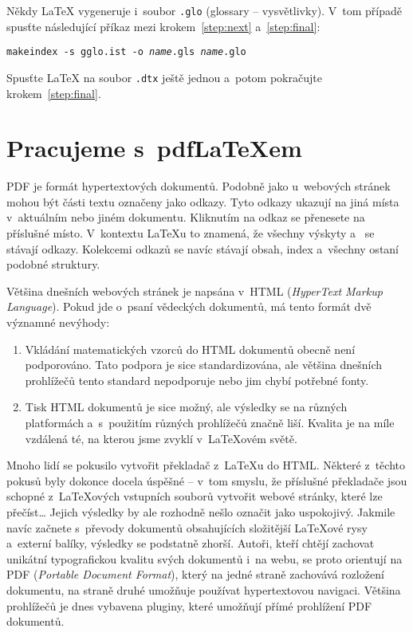 Někdy \LaTeX{} vygeneruje i~soubor \texttt{.glo} (glossary -- vysvětlivky).
V~tom případě spusťte následující příkaz mezi
krokem~\ref{step:next} a~\ref{step:final}:

\noindent\texttt{makeindex -s gglo.ist -o \textit{name}.gls \textit{name}.glo}

\noindent Spusťte \LaTeX{} na soubor \texttt{.dtx} ještě jednou
a~potom pokračujte krokem~\ref{step:final}.



\section{Pracujeme s~pdf\LaTeX em} \label{sec:pdftex}
%
PDF je formát hypertextových dokumentů. Podobně jako u~webových
stránek mohou být části textu označeny jako odkazy. Tyto
odkazy ukazují na jiná místa v~aktuálním nebo jiném dokumentu.
Kliknutím na odkaz se přenesete na příslušné místo.
V~kontextu \LaTeX u to znamená, že všechny výskyty 
a~ se stávají odkazy. Kolekcemi odkazů se navíc
stávají obsah, index a~všechny ostaní podobné struktury.

Většina dnešních webových stránek je napsána v~HTML
(\emph{HyperText Markup Language}). Pokud jde o~psaní vědeckých
dokumentů, má tento formát dvě významné nevýhody:
\begin{enumerate}
\item Vkládání matematických vzorců do HTML dokumentů obecně není
  podporováno. Tato podpora je sice standardizována, ale většina
  dnešních prohlížečů tento standard nepodporuje nebo jim chybí
  potřebné fonty.
\item Tisk HTML dokumentů je sice možný, ale výsledky se na různých
  platformách a~s~použitím různých prohlížečů značně liší.
  Kvalita je na míle vzdálená té, na kterou jsme zvyklí
  v~\LaTeX ovém světě.
\end{enumerate}

Mnoho lidí se pokusilo vytvořit překladač z~\LaTeX u do HTML. Některé
z~těchto pokusů byly dokonce docela úspěšné -- v~tom smyslu, že příslušné
překladače jsou schopné z~\LaTeX ových vstupních souborů vytvořit
webové stránky, které lze přečíst\ldots{} Jejich výsledky by ale
rozhodně nešlo označit jako uspokojivý. Jakmile navíc začnete
s~převody dokumentů obsahujících složitější \LaTeX ové rysy
a~externí balíky, výsledky se podstatně zhorší. Autoři, kteří
chtějí zachovat unikátní typografickou kvalitu svých dokumentů
i~na webu, se proto orientují na PDF (\emph{Portable Document
Format}), který na jedné straně zachovává rozložení dokumentu,
na straně druhé umožňuje používat hypertextovou navigaci. Většina
prohlížečů je dnes vybavena pluginy, které umožňují přímé
prohlížení PDF dokumentů.

